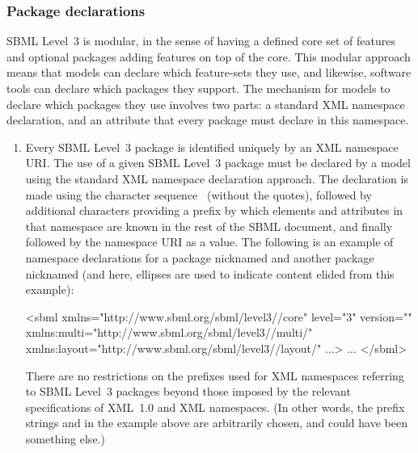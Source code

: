 \subsubsection{Package declarations}
\label{sec:sbml-packages}

SBML Level~3 is modular, in the sense of having a defined core set
of features and optional packages adding features on top of the
core.  This modular approach means that models can declare which
feature-sets they use, and likewise, software tools can declare
which packages they support.  The mechanism for models to declare
which packages they use involves two parts: a standard XML
namespace declaration, and an attribute that every package must
declare in this namespace.
\begin{enumerate}

\item Every SBML Level~3 package is identified uniquely by an XML
  namespace URI.  The use of a given SBML Level~3 package must be
  declared by a model using the standard XML namespace declaration
  approach.  The declaration is made using the character sequence
  \ (without the quotes), followed by additional
  characters providing a prefix by which elements and attributes
  in that namespace are known in the rest of the SBML document,
  and finally followed by the namespace URI as a value.  The
  following is an example of namespace declarations for a package
  nicknamed  and another package nicknamed 
  (and here, ellipses are used to indicate content elided from
  this example):
  \begin{example}
<sbml xmlns="http://www.sbml.org/sbml/level3/\thisvlc/core" level="3" version="\sbmlversionnum"
      xmlns:multi="http://www.sbml.org/sbml/level3/\thisvlc/multi/\thisvlc"
      xmlns:layout="http://www.sbml.org/sbml/level3/\thisvlc/layout/\thisvlc" ...>
  ...  
</sbml>\end{example}
  There are no restrictions on the prefixes used for XML namespaces
  referring to SBML Level~3 packages beyond those imposed by the
  relevant specifications of XML~1.0 and XML namespaces.  (In other
  words, the prefix strings  and  in the
  example above are arbitrarily chosen, and could have been
  something else.)


\end{enumerate}
